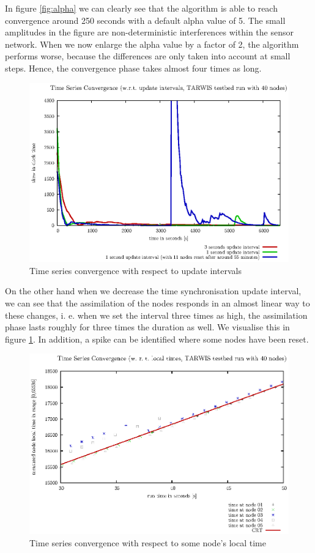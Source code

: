 \documentclass{llncs}
\begin{document}
\noindent In figure \ref{fig:alpha} we can clearly see that the algorithm is able to reach convergence around 250 seconds with a default alpha value of 5. The small amplitudes in the figure are non-deterministic interferences within the sensor network. When we now enlarge the alpha value by a factor of 2, the algorithm performs worse, because the differences are only taken into account at small steps. Hence, the convergence phase takes almost four times as long.\\
\begin{figure}[H]
	\centering
	\includegraphics[scale=0.6]{images/FIG_02.eps}
	\caption{Time series convergence with respect to update intervals}
	\label{fig:update_intervals}
\end{figure}
\noindent On the other hand when we decrease the time synchronisation update interval, we can see that the assimilation of the nodes responds in an almost linear way to these changes, i. e. when we set the interval three times as high, the assimilation phase lasts roughly for three times the duration as well. We visualise this in figure \ref{fig:update_intervals}. In addition, a spike can be identified where some nodes have been reset.\\

\begin{figure}[H]
	\centering
	\includegraphics[scale=0.6]{images/FIG_03.eps}
	\caption{Time series convergence with respect to some node's local time}
	\label{fig:local_time}
\end{figure}
\end{document}
